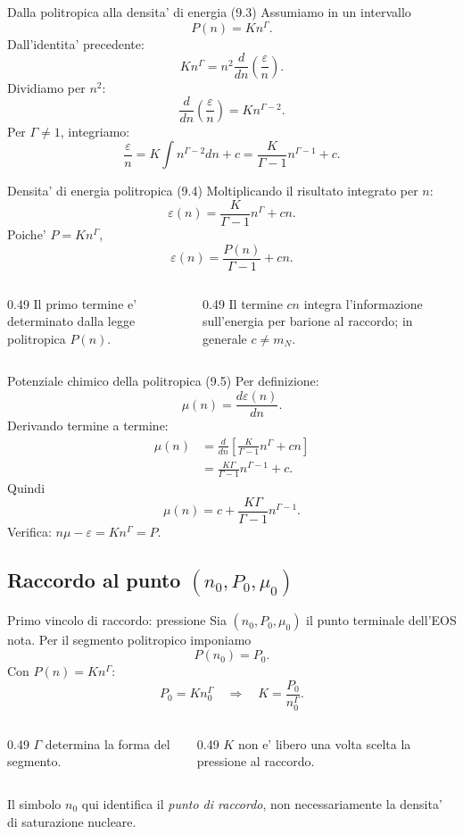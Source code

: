 \begin{frame}{Dalla politropica alla densita' di energia (9.3)}
\small
Assumiamo in un intervallo
\[
P(n)=Kn^\Gamma.
\]
Dall'identita' precedente:
\[
Kn^\Gamma=n^2\frac{d}{dn}\left(\frac{\varepsilon}{n}\right).
\]
Dividiamo per $n^2$:
\[
{\frac{d}{dn}\left(\frac{\varepsilon}{n}\right)=Kn^{\Gamma-2}.}
\]
Per $\Gamma\ne1$, integriamo:
\[
\frac{\varepsilon}{n}=K\int n^{\Gamma-2}dn+c
=\frac{K}{\Gamma-1}n^{\Gamma-1}+c.
\]
\end{frame}

\begin{frame}{Densita' di energia politropica (9.4)}
\small
Moltiplicando il risultato integrato per $n$:
\[
{\varepsilon(n)=\frac{K}{\Gamma-1}n^\Gamma+cn.}
\]
Poiche' $P=Kn^\Gamma$,
\[
{\varepsilon(n)=\frac{P(n)}{\Gamma-1}+cn.}
\]
\begin{columns}[T,onlytextwidth]
\begin{column}{0.49\textwidth}
Il primo termine e' determinato dalla legge politropica $P(n)$.
\end{column}
\begin{column}{0.49\textwidth}
Il termine $cn$ integra l'informazione sull'energia per barione al raccordo; in generale $c\ne m_N$.
\end{column}
\end{columns}
\end{frame}

\begin{frame}{Potenziale chimico della politropica (9.5)}
\small
Per definizione:
\[
\mu(n)=\frac{d\varepsilon(n)}{dn}.
\]
Derivando termine a termine:
\[
\begin{aligned}
\mu(n)&=\frac{d}{dn}\left[\frac{K}{\Gamma-1}n^\Gamma+cn\right]\\
&=\frac{K\Gamma}{\Gamma-1}n^{\Gamma-1}+c.
\end{aligned}
\]
Quindi
\[
{\mu(n)=c+\frac{K\Gamma}{\Gamma-1}n^{\Gamma-1}.}
\]
Verifica: $n\mu-\varepsilon=Kn^\Gamma=P$.
\end{frame}

\subsection{Raccordo al punto $(n_0,P_0,\mu_0)$}

\begin{frame}{Primo vincolo di raccordo: pressione}
\small
Sia $(n_0,P_0,\mu_0)$ il punto terminale dell'EOS nota.
\medskip
Per il segmento politropico imponiamo
\[
P(n_0)=P_0.
\]
Con $P(n)=Kn^\Gamma$:
\[
P_0=Kn_0^\Gamma
\quad\Longrightarrow\quad
{K=\frac{P_0}{n_0^\Gamma}.}
\]
\begin{columns}[T,onlytextwidth]
\begin{column}{0.49\textwidth}
$\Gamma$ determina la forma del segmento.
\end{column}
\begin{column}{0.49\textwidth}
$K$ non e' libero una volta scelta la pressione al raccordo.
\end{column}
\end{columns}
\medskip
Il simbolo $n_0$ qui identifica il \emph{punto di raccordo}, non necessariamente la densita' di saturazione nucleare.
\end{frame}


